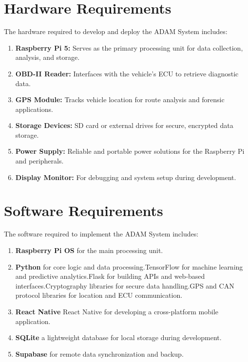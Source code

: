 \section{Hardware Requirements}
The hardware required to develop and deploy the ADAM System includes:
\begin{enumerate}
    \item \textbf{Raspberry Pi 5:} Serves as the primary processing unit for data collection, analysis, and storage.
    \item \textbf{OBD-II Reader:} Interfaces with the vehicle’s ECU to retrieve diagnostic data.
    \item \textbf{GPS Module:} Tracks vehicle location for route analysis and forensic applications.
    \item \textbf{Storage Devices:} SD card or external drives for secure, encrypted data storage.
    \item \textbf{Power Supply:} Reliable and portable power solutions for the Raspberry Pi and peripherals.
    \item \textbf{Display Monitor:} For debugging and system setup during development.
\end{enumerate}

\section{Software Requirements}
The software required to implement the ADAM System includes:
\begin{enumerate}
    \item \textbf{Raspberry Pi OS}  for the main processing unit.
    \item \textbf{Python}  for core logic and data processing.TensorFlow for machine learning and predictive analytics.Flask for building APIs and web-based interfaces.Cryptography libraries for secure data handling.GPS and CAN protocol libraries for location and ECU communication.
    \item \textbf{React Native} React Native for developing a cross-platform mobile application.
    \item \textbf{SQLite} a lightweight database for local storage during development.
    \item \textbf{Supabase}  for remote data synchronization and backup.
\end{enumerate}
